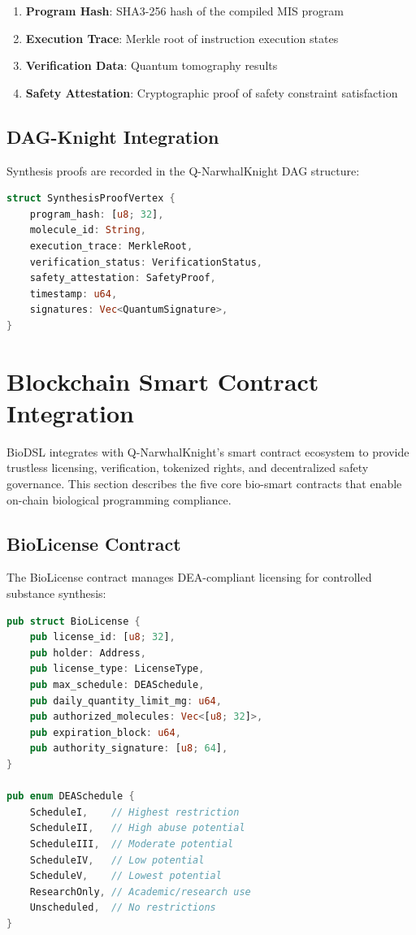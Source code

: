 \documentclass[12pt,a4paper]{article}
\begin{document}
\begin{enumerate}
    \item \textbf{Program Hash}: SHA3-256 hash of the compiled MIS program
    \item \textbf{Execution Trace}: Merkle root of instruction execution states
    \item \textbf{Verification Data}: Quantum tomography results
    \item \textbf{Safety Attestation}: Cryptographic proof of safety constraint satisfaction
\end{enumerate}

\subsection{DAG-Knight Integration}

Synthesis proofs are recorded in the Q-NarwhalKnight DAG structure:

\begin{lstlisting}[language=Rust,caption={Synthesis proof vertex}]
struct SynthesisProofVertex {
    program_hash: [u8; 32],
    molecule_id: String,
    execution_trace: MerkleRoot,
    verification_status: VerificationStatus,
    safety_attestation: SafetyProof,
    timestamp: u64,
    signatures: Vec<QuantumSignature>,
}
\end{lstlisting}

\section{Blockchain Smart Contract Integration}

BioDSL integrates with Q-NarwhalKnight's smart contract ecosystem to provide trustless licensing, verification, tokenized rights, and decentralized safety governance. This section describes the five core bio-smart contracts that enable on-chain biological programming compliance.

\subsection{BioLicense Contract}

The BioLicense contract manages DEA-compliant licensing for controlled substance synthesis:

\begin{lstlisting}[language=Rust,caption={BioLicense contract interface}]
pub struct BioLicense {
    pub license_id: [u8; 32],
    pub holder: Address,
    pub license_type: LicenseType,
    pub max_schedule: DEASchedule,
    pub daily_quantity_limit_mg: u64,
    pub authorized_molecules: Vec<[u8; 32]>,
    pub expiration_block: u64,
    pub authority_signature: [u8; 64],
}

pub enum DEASchedule {
    ScheduleI,    // Highest restriction
    ScheduleII,   // High abuse potential
    ScheduleIII,  // Moderate potential
    ScheduleIV,   // Low potential
    ScheduleV,    // Lowest potential
    ResearchOnly, // Academic/research use
    Unscheduled,  // No restrictions
}
\end{lstlisting}
\end{document}
